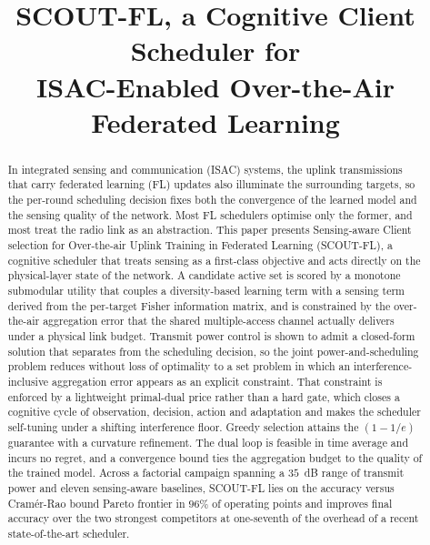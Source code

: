\documentclass[lettersize,journal]{IEEEtran}
\newcommand{\scout}{SCOUT-FL}
\begin{document}
\title{SCOUT-FL, a Cognitive Client Scheduler for\\ ISAC-Enabled Over-the-Air\\ Federated Learning}

\maketitle

\begin{abstract}
In integrated sensing and communication (ISAC) systems, the uplink transmissions that carry federated learning (FL) updates also illuminate the surrounding targets, so the per-round scheduling decision fixes both the convergence of the learned model and the sensing quality of the network. Most FL schedulers optimise only the former, and most treat the radio link as an abstraction. This paper presents Sensing-aware Client selection for Over-the-air Uplink Training in Federated Learning (\scout{}), a cognitive scheduler that treats sensing as a first-class objective and acts directly on the physical-layer state of the network. A candidate active set is scored by a monotone submodular utility that couples a diversity-based learning term with a sensing term derived from the per-target Fisher information matrix, and is constrained by the over-the-air aggregation error that the shared multiple-access channel actually delivers under a physical link budget. Transmit power control is shown to admit a closed-form solution that separates from the scheduling decision, so the joint power-and-scheduling problem reduces without loss of optimality to a set problem in which an interference-inclusive aggregation error appears as an explicit constraint. That constraint is enforced by a lightweight primal-dual price rather than a hard gate, which closes a cognitive cycle of observation, decision, action and adaptation and makes the scheduler self-tuning under a shifting interference floor. Greedy selection attains the $(1-1/e)$ guarantee with a curvature refinement. The dual loop is feasible in time average and incurs no regret, and a convergence bound ties the aggregation budget to the quality of the trained model. Across a factorial campaign spanning a $35$~dB range of transmit power and eleven sensing-aware baselines, \scout{} lies on the accuracy versus Cram\'er-Rao bound Pareto frontier in $96\%$ of operating points and improves final accuracy over the two strongest competitors at one-seventh of the overhead of a recent state-of-the-art scheduler.%
\end{abstract}
\end{document}
